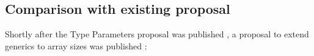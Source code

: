 \subsection{Comparison with existing proposal}

Shortly after the Type Parameters proposal was published
\autocite{genericsProposal}, a proposal to extend generics to array sizes was
published \autocite{goArrayProposal}:


